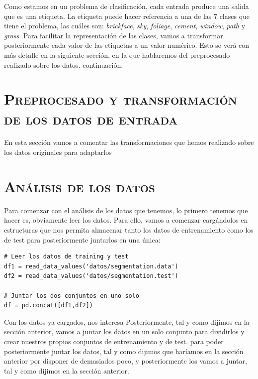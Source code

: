 \documentclass[11pt,a4paper]{article}
\begin{document}
Como estamos en un problema de clasificación, cada entrada produce una salida que es una etiqueta. La etiqueta puede hacer
referencia a una de las 7 clases que tiene el problema, las cuáles son: \textit{brickface}, \textit{sky},
\textit{foliage}, \textit{cement}, \textit{window}, \textit{path} y \textit{grass}. Para facilitar la representación de
las clases, vamos a transformar posteriormente cada valor de las etiquetas a un valor numérico. Esto se verá con más
detalle en la siguiente sección, en la que hablaremos del preprocesado realizado sobre los datos.
continuación.

\newpage

\section{\textsc{Preprocesado y transformación de los datos de entrada}}

En esta sección vamos a comentar las transformaciones que hemos realizado sobre los datos originales para adaptarlos

\section{\textsc{Análisis de los datos}}

Para comenzar con el análisis de los datos que tenemos, lo primero tenemos que hacer es, obviamente leer los datos. Para
ello, vamos a comenzar cargándolos en estructuras que nos permita almacenar tanto los datos de entrenamiento como los de
test para posteriormente juntarlos en una única:

\begin{lstlisting}
# Leer los datos de training y test
df1 = read_data_values('datos/segmentation.data')
df2 = read_data_values('datos/segmentation.test')

# Juntar los dos conjuntos en uno solo
df = pd.concat([df1,df2])
\end{lstlisting}

Con los datos ya cargados, nos interesa
Posteriormente, tal y como dijimos en la sección anterior, vamos a juntar los datos en un solo conjunto para
dividirlos y crear nuestros propios conjuntos de entrenamiento y de test. para poder posteriormente juntar los datos, tal y como dijimos que haríamos en la sección anterior por disponer de
demasiados poco, y posteriormente los vamos a juntar, tal y como dijimos en la sección anterior.

\newpage
\end{document}
